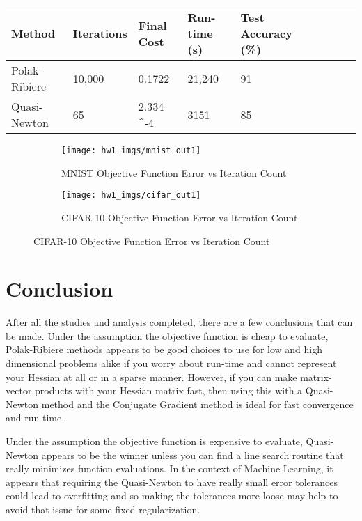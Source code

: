 \begin{minipage}{\linewidth}
\centering
{}  \label{tab:cipar}
\begin{tabular}{l|l l l l|l l l l}
\toprule[1.5pt]
    \bf Method & \bf Iterations & \bf Final Cost & \bf Run-time (s) & \bf Test Accuracy (\%) \\ \hline
    Polak-Ribiere & 10,000& 0.1722& 21,240&91\\
    Quasi-Newton & 65& 2.334 \cdot 10^{-4}&3151 &85 \\
\bottomrule[1.25pt]
\end{tabular}
\bigskip
\end{minipage}

\begin{figure}[h!]
    \begin{subfigure}{\textwidth}
      \texttt{[image: hw1\_imgs/mnist\_out1]}\hfill
      \caption{MNIST Objective Function Error vs Iteration Count}
      \label{fig:mnist1}
    \end{subfigure}%
    \begin{subfigure}{\textwidth}
      \texttt{[image: hw1\_imgs/cifar\_out1]}\hfill
      \caption{CIFAR-10 Objective Function Error vs Iteration Count}
      \label{fig:cifar1}
    \end{subfigure}
\end{figure}

\section{Conclusion}
After all the studies and analysis completed, there are a few conclusions that can be made. Under the assumption the objective function is cheap to evaluate, Polak-Ribiere methods appears to be good choices to use for low and high dimensional problems alike if you worry about run-time and cannot represent your Hessian at all or in a sparse manner. However, if you can make matrix-vector products with your Hessian matrix fast, then using this with a Quasi-Newton method and the Conjugate Gradient method is ideal for fast convergence and run-time.

Under the assumption the objective function is expensive to evaluate, Quasi-Newton appears to be the winner unless you can find a line search routine that really minimizes function evaluations. In the context of Machine Learning, it appears that requiring the Quasi-Newton to have really small error tolerances could lead to overfitting and so making the tolerances more loose may help to avoid that issue for some fixed regularization.

